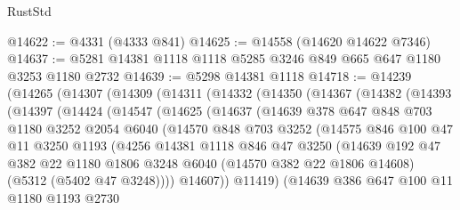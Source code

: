 \begin{lexlean}{RustStd}
\begin{coremodule}
@14622 := @4331 (@4333 @841)
@14625 := @14558 (@14620 @14622 @7346)
@14637 := @5281 @14381 @1118 @1118 @5285 @3246 @849 @665 @647 @1180 @3253 @1180 @2732
@14639 := @5298 @14381 @1118
@14718 := @14239
    (@14265
      (@14307
        (@14309
          (@14311
            (@14332
              (@14350
                (@14367
                  (@14382
                    (@14393
                      (@14397
                        (@14424
                          (@14547
                            (@14625
                              (@14637
                                (@14639
                                  @378
                                  @647
                                  @848
                                  @703
                                  @1180
                                  @3252
                                  @2054
                                  @6040
                                  (@14570
                                    @848
                                    @703
                                    @3252
                                    (@14575
                                      @846
                                      @100
                                      @47
                                      @11
                                      @3250
                                      @1193
                                      (@4256
                                        @14381
                                        @1118
                                        @846
                                        @47
                                        @3250
                                        (@14639
                                          @192
                                          @47
                                          @382
                                          @22
                                          @1180
                                          @1806
                                          @3248
                                          @6040
                                          (@14570 @382 @22 @1806 @14608)
                                          (@5312 (@5402 @47 @3248))))
                                      @14607))
                                  @11419)
                                (@14639
                                  @386
                                  @647
                                  @100
                                  @11
                                  @1180
                                  @1193
                                  @2730

\end{coremodule}
\end{lexlean}
